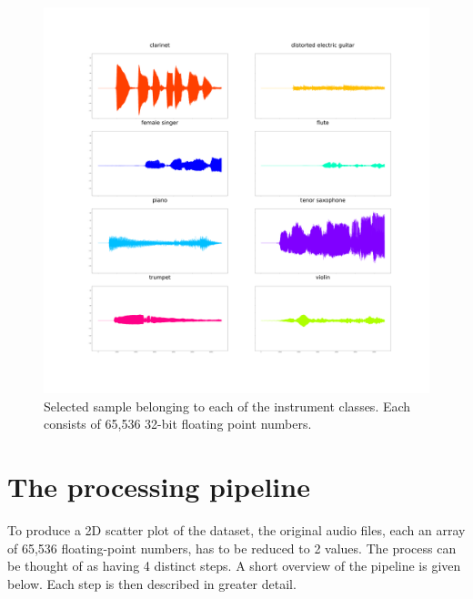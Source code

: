 \documentclass[a4paper, 12pt, twoside]{report}
\begin{document}
\begin{figure}[h!]
\centering
\includegraphics[width=.9\linewidth]{./Figures/8_samples.png}
\caption{Selected sample belonging to each of the instrument classes. Each consists of 65,536 32-bit floating point numbers.}
\label{fig:8-plots}
\end{figure}

\section{The processing pipeline}
\label{sec:org82c3cb3}

To produce a 2D scatter plot of the dataset, the original audio files, each an array of 65,536 floating-point numbers, has to be reduced to 2 values.
The process can be thought of as having 4 distinct steps. A short overview of the pipeline is given below. Each step is then described in greater detail.
\end{document}
